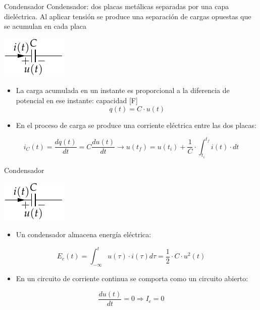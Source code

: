 \documentclass[aspectratio=169, xcolor={usenames,svgnames,dvipsnames}]{beamer}
\begin{document}
\begin{frame}{Condensador}
\alert{Condensador}: dos placas metálicas separadas por una capa dieléctrica. Al aplicar tensión se produce una \alert{separación de cargas opuestas} que se \alert{acumulan} en cada placa
\begin{center}
\includegraphics[height=0.2\textheight]{../figs/Condensador.pdf}
\end{center}

\begin{itemize}
\item La \alert{carga acumulada} en un instante es \alert{proporcional} a la \alert{diferencia de potencial} en ese instante: \alert{capacidad} [F]
\[
q(t) = C \cdot u(t)
\]
\item En el proceso de carga se produce una corriente eléctrica entre las dos placas:
\end{itemize}
\begin{equation*}
    i_C(t)=\frac{dq(t)}{dt}=C\frac{du(t)}{dt}\rightarrow u(t_f)=u(t_i)+\dfrac{1}{C}\cdot\int_{t_i}^{t_f} i(t)\cdot dt
\end{equation*}

\end{frame}


\begin{frame}{Condensador}
\begin{center}
\includegraphics[height=0.2\textheight]{../figs/Condensador.pdf}
\end{center}

\begin{itemize}
\item Un condensador almacena \alert{energía eléctrica}:
\end{itemize}
\[
  E_c(t) = \int_{-\infty}^t u(\tau) \cdot i(\tau) d\tau = \frac{1}{2} \cdot C \cdot u^2(t)
\]

\begin{itemize}
\item En un circuito de corriente continua se comporta como un \alert{circuito abierto}:
\end{itemize}
\begin{equation*}
  \frac{du(t)}{dt} = 0 \Rightarrow I_c = 0
\end{equation*}
\end{frame}
\end{document}

